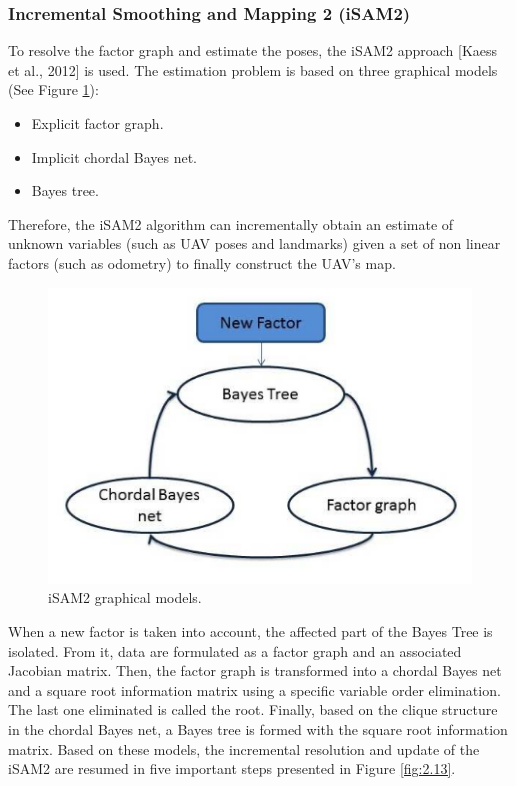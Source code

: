 \documentclass[11pt,openany]{book}
\begin{document}
\subsubsection{Incremental Smoothing and Mapping 2 (iSAM2)}
To resolve the factor graph and estimate the poses, the iSAM2 approach [Kaess et al., 2012] is used. The estimation problem is based on three graphical models (See Figure \ref{fig:2.12}):
\begin{itemize}
    \item Explicit factor graph.
    \item Implicit chordal Bayes net.
    \item Bayes tree.
\end{itemize}
Therefore, the iSAM2 algorithm can incrementally obtain an estimate of unknown variables (such as UAV poses and landmarks) given a set of non linear factors (such as odometry) to ﬁnally construct the UAV’s map.
\begin{figure}[H]
    \centering
    \includegraphics[scale=0.7]{assets/2_12.png}
    \caption{iSAM2 graphical models.}
    \label{fig:2.12}
\end{figure}
When a new factor is taken into account, the aﬀected part of the Bayes Tree is isolated. From it, data are formulated as a factor graph and an associated Jacobian matrix. Then, the factor graph is transformed into a chordal Bayes net and a square root information matrix using a speciﬁc variable order elimination. The last one eliminated is called the root. Finally, based on the clique structure in the chordal Bayes net, a Bayes tree is formed with the square root information matrix. Based on these models, the incremental resolution and update of the iSAM2 are resumed in ﬁve important steps presented in Figure \ref{fig:2.13}.
\end{document}
